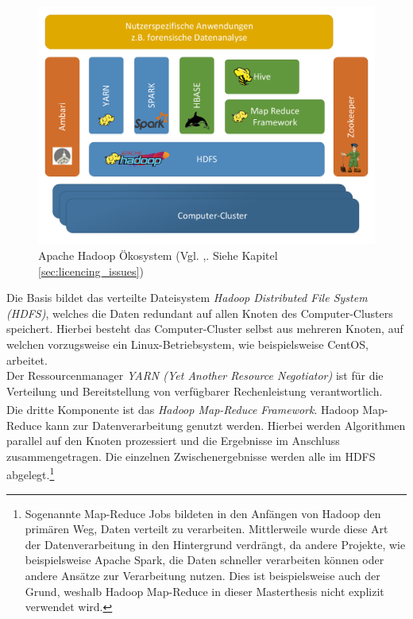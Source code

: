 \begin{figure}[ht]
  \centering
  \includegraphics[width=\textwidth]{./resource/hadoop_framework_structure.pdf}
  \caption{Apache Hadoop Ökosystem (Vgl. \cite{big_data_praxis},\cite{expert_hadoop_admin}. Siehe Kapitel \ref{sec:licencing_issues})}
  \label{fig:hadoop_framework_structure}
\end{figure}

\noindent
Die Basis bildet das verteilte Dateisystem \textit{Hadoop Distributed File System (HDFS)}, welches die Daten redundant auf allen Knoten des Computer-Clusters speichert. Hierbei besteht das Computer-Cluster selbst aus mehreren Knoten, auf welchen vorzugsweise ein Linux-Betriebsystem, wie beispielsweise CentOS, arbeitet.\\
Der Ressourcenmanager \textit{YARN (Yet Another Resource Negotiator)} ist für die Verteilung und Bereitstellung von verfügbarer Rechenleistung verantwortlich.\\ 
Die dritte Komponente ist das \textit{Hadoop\textsuperscript{\textregistered} Map-Reduce Framework}. Hadoop Map-Reduce kann zur Datenverarbeitung genutzt werden. Hierbei werden Algorithmen parallel auf den Knoten prozessiert und die Ergebnisse im Anschluss zusammengetragen. Die einzelnen Zwischenergebnisse werden alle im HDFS abgelegt.\footnote{Sogenannte Map-Reduce Jobs bildeten in den Anfängen von Hadoop den primären Weg, Daten verteilt zu verarbeiten. Mittlerweile wurde diese Art der Datenverarbeitung in den Hintergrund verdrängt, da andere Projekte, wie beispielsweise Apache Spark, die Daten schneller verarbeiten können oder andere Ansätze zur Verarbeitung nutzen. Dies ist beispielsweise auch der Grund, weshalb Hadoop Map-Reduce in dieser Masterthesis nicht explizit verwendet wird.} \\

